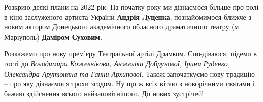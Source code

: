 
Розкрию деякі плани на 2022 рік. На початку року ми дізнаємося більше про ролі
в кіно заслуженого артиста України \textbf{Андрія Луценка}, познайомимося ближче з новим
актором Донецького академічного обласного драматичного театру (м. Маріуполь)
\textbf{Даміром Суховим.}

Розкажемо про нову прем'єру Театральної артілі Драмком. Спо\hyp{}діваюся, підемо в
гості до \emph{Володимира Кожевнікова, Анжеліки  Добрунової, Ірини Руденко,
Олександра Арутюняна та Ганни Архипової}. Також започаткуємо нову традицію – про
яку дізнаємося трохи згодом. Ну що ж всіх вітаю з новорічними святами і бажаю
здійснення всього найзаповітнішого. До нових зустрічей!
